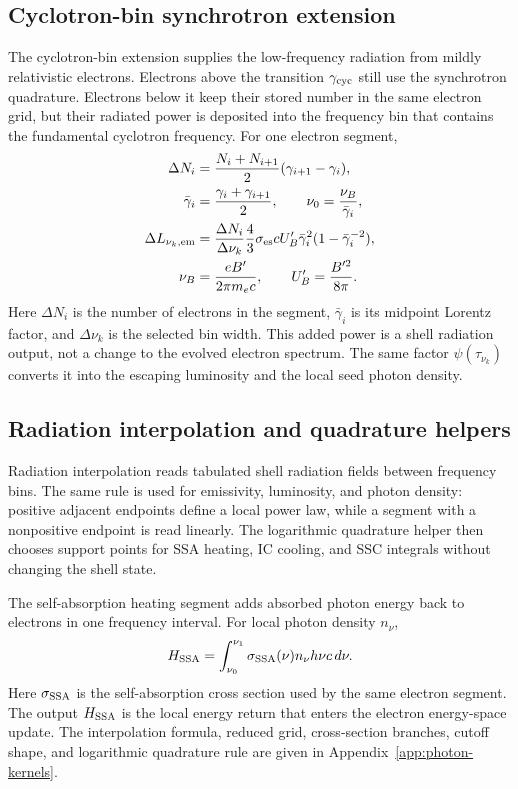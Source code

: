 \documentclass[twocolumn]{aastex702}
\begin{document}
\subsection{Cyclotron-bin synchrotron extension}

The cyclotron-bin extension supplies the low-frequency radiation from mildly
relativistic electrons.  Electrons above the transition \(\gamma_{\rm cyc}\)
still use the synchrotron quadrature.  Electrons below it keep their stored
number in the same electron grid, but their radiated power is deposited into the
frequency bin that contains the fundamental cyclotron frequency.  For one
electron segment,
\begin{equation}
\begin{aligned}
\Delta N_i&=\frac{N_i+N_{i+1}}{2}(\gamma_{i+1}-\gamma_i),\\
\bar\gamma_i&=\frac{\gamma_i+\gamma_{i+1}}{2},\qquad
\nu_0=\frac{\nu_B}{\bar\gamma_i},\\
\Delta L_{\nu_k,{\rm em}}&=
\frac{\Delta N_i}{\Delta\nu_k}
\frac{4}{3}\sigma_{\rm es}cU'_B
\bar\gamma_i^2(1-\bar\gamma_i^{-2}),\\
\nu_B&=\frac{eB'}{2\pi m_e c},\qquad
U'_B=\frac{B'^2}{8\pi}.
\end{aligned}
\end{equation}
Here \(\Delta N_i\) is the number of electrons in the segment, \(\bar\gamma_i\)
is its midpoint Lorentz factor, and \(\Delta\nu_k\) is the selected bin width.
This added power is a shell radiation output, not a change to the evolved
electron spectrum.  The same factor \(\psi(\tau_{\nu_k})\) converts it into the
escaping luminosity and the local seed photon density.

\subsection{Radiation interpolation and quadrature helpers}
\label{sec:positive-field-interpolation}

Radiation interpolation reads tabulated shell radiation fields between frequency
bins.  The same rule is used for emissivity, luminosity, and photon density:
positive adjacent endpoints define a local power law, while a segment with a
nonpositive endpoint is read linearly.  The logarithmic quadrature helper then
chooses support points for SSA heating, IC cooling, and SSC integrals without
changing the shell state.

The self-absorption heating segment adds absorbed photon energy back to electrons
in one frequency interval.  For local photon density \(n_\nu\),
\begin{equation}
H_{\rm SSA}=
\int_{\nu_0}^{\nu_1}\sigma_{\rm SSA}(\nu)n_\nu h\nu c\,d\nu .
\end{equation}
Here \(\sigma_{\rm SSA}\) is the self-absorption cross section used by the same
electron segment.  The output \(H_{\rm SSA}\) is the local energy return that
enters the electron energy-space update.  The interpolation formula, reduced
grid, cross-section branches, cutoff shape, and logarithmic quadrature rule are
given in Appendix~\ref{app:photon-kernels}.
\end{document}
